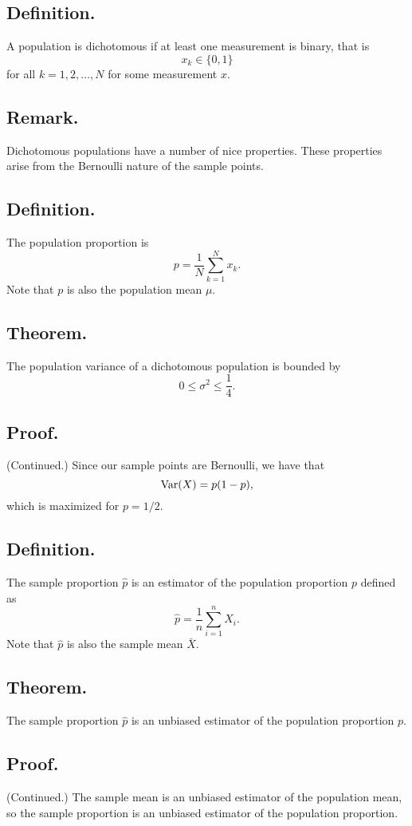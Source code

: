 \documentclass[titlepage]{article}
\begin{document}
\subsection{Definition.} A population is dichotomous if at least one measurement is binary, that is 
$$x_{k} \in \{0, 1\}$$
for all $k = 1, 2, \ldots, N$ for some measurement $x$.

\subsection{Remark.} Dichotomous populations have a number of nice properties. These properties arise from the Bernoulli nature of the sample points.

\subsection{Definition.} The population proportion is
$$p = \frac{1}{N}\sum_{k=1}^{N}x_{k}.$$
Note that $p$ is also the population mean $\mu$.

\subsection{Theorem.} The population variance of a dichotomous population is bounded by 
$$0 \leq \sigma^{2} \leq \frac{1}{4}.$$

\subsection{Proof.} (Continued.) Since our sample points are Bernoulli, we have that 
$$\text{Var}(X) = p(1-p),$$
which is maximized for $p = 1/2$.

\subsection{Definition.} The sample proportion $\hat{p}$ is an estimator of the population proportion $p$ defined as
$$\hat{p} = \frac{1}{n}\sum_{i=1}^{n}X_{i}.$$
Note that $\hat{p}$ is also the sample mean $\bar{X}$.

\subsection{Theorem.} The sample proportion $\hat{p}$ is an unbiased estimator of the population proportion $p$.

\subsection{Proof.} (Continued.) The sample mean is an unbiased estimator of the population mean, so the sample proportion is an unbiased estimator of the population proportion.
\end{document}
